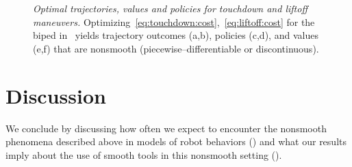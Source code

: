 \documentclass{article}
\begin{document}
\begin{figure}[!htb]

\caption{\label{fig:opt}
\emph{Optimal trajectories, values and policies for touchdown and liftoff maneuvers.}
Optimizing~\eqref{eq:touchdown:cost},~\eqref{eq:liftoff:cost} for the biped in~ yields trajectory outcomes (a,b), policies (c,d), and values (e,f) that are nonsmooth (piecewise--differentiable or discontinuous).
%
}
\end{figure}



\section{Discussion}
\label{sec:disc}

We conclude by discussing
how often we expect to encounter the nonsmooth phenomena described above in models of robot behaviors ()
and
what our results imply about the use of smooth tools in this nonsmooth setting ().
\end{document}
